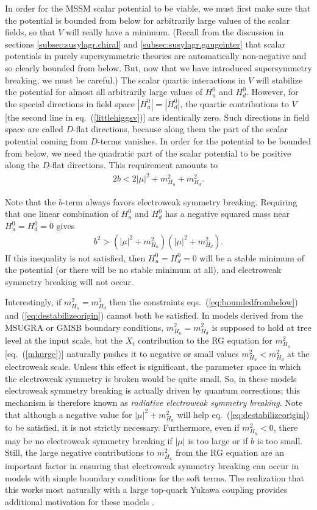 \documentclass[11pt]{article}
\def\beq{\begin{eqnarray}}
\def\eeq{\end{eqnarray}}
\begin{document}
In order for the MSSM scalar potential to be viable, we must first make 
sure that the potential is bounded from below for arbitrarily large values 
of the scalar fields, so that $V$ will really have a minimum. (Recall from 
the discussion in sections \ref{subsec:susylagr.chiral} and 
\ref{subsec:susylagr.gaugeinter} that scalar potentials in purely 
supersymmetric theories are automatically non-negative and so clearly 
bounded from below. But, now that we have introduced supersymmetry 
breaking, we must be careful.) The scalar quartic interactions in $V$ will 
stabilize the potential for almost all arbitrarily large values of $H_u^0$ 
and $H_d^0$. However, for the special directions in field space $|H_u^0| = 
|H_d^0|$, the quartic contributions to $V$ [the second line in 
eq.~(\ref{littlehiggsv})] are identically zero. Such directions in field 
space are called $D$-flat directions, because along them the part of the 
scalar potential coming from $D$-terms vanishes. In order for the 
potential to be bounded from below, we need the quadratic part of the 
scalar potential to be positive along the $D$-flat directions. This 
requirement amounts to
\beq
2 b < 2 |\mu |^2 + m^2_{H_u} + m^2_{H_d}.
\label{eq:boundedfrombelow}
\eeq

Note that the $b$-term always favors electroweak symmetry breaking. 
Requiring that one linear combination of $H_u^0$ and $H_d^0$ has a 
negative squared mass near $H_u^0=H_d^0=0$ gives
\beq
b^2 > (|\mu|^2 + m^2_{H_u} )(|\mu|^2 + m^2_{H_d}).
\label{eq:destabilizeorigin}
\eeq
If this inequality is not satisfied, then $H_u^0 = H_d^0 = 0$ will be a 
stable minimum of the potential (or there will be no stable minimum at 
all), and electroweak symmetry breaking will not occur.

Interestingly, if $m_{H_u}^2 = m_{H_d}^2$ then the constraints 
eqs.~(\ref{eq:boundedfrombelow}) and (\ref{eq:destabilizeorigin}) cannot 
both be satisfied. In models derived from the MSUGRA or 
GMSB boundary conditions, $m_{H_u}^2 = m_{H_d}^2$ is supposed to 
hold at tree level at the input scale, but the $X_t$ contribution to the 
RG equation for $m_{H_u}^2$ [eq.~(\ref{mhurge})] naturally pushes it to 
negative or small values $m_{H_u}^2 < m_{H_d}^2$ at the electroweak scale. 
Unless this effect is significant, the parameter space in which the 
electroweak symmetry is broken would be quite small. So, in these models 
electroweak symmetry breaking is actually driven by quantum corrections; 
this mechanism is therefore known as {\it radiative electroweak symmetry 
breaking}. Note that although a negative value for $|\mu|^2 + m_{H_u}^2$ 
will help eq.~(\ref{eq:destabilizeorigin}) to be satisfied, it is not 
strictly necessary. Furthermore, even if $m_{H_u}^2<0$, there may be no 
electroweak symmetry breaking if $|\mu|$ is too large or if $b$ is too 
small. Still, the large negative contributions to $m_{H_u}^2$ from the RG 
equation are an important factor in ensuring that electroweak symmetry 
breaking can occur in models with simple boundary conditions for the soft 
terms. The realization that this works most naturally with a large 
top-quark Yukawa coupling provides additional motivation for these models 
\cite{rewsbone,rewsbtwo}.
\end{document}
